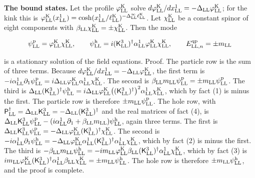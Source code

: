 \documentclass[
  10pt,
]{article}
\begin{document}
\textbf{The bound states.} Let the profile \(\varphi^{\rm K}_{\rm LL}\)
solve
\(d\varphi^{\rm K}_{\rm LL}/dx^1_{\rm LL}=-\Delta_{\rm LL}\varphi^{\rm K}_{\rm LL}\);
for the kink this is
\(\varphi^{\rm K}_{\rm LL}(x^1_{\rm LL})=\cosh(x^1_{\rm LL}/\ell^{\rm K}_{\rm LL})^{-\Delta^\infty_{\rm LL}\ell^{\rm K}_{\rm LL}}\).
Let \(\chi^{\rm K}_{\rm LL}\) be a constant spinor of eight components
with \(\beta_{\rm LL}\chi^{\rm K}_{\rm LL}=\pm\chi^{\rm K}_{\rm LL}\).
Then the mode

\[\psi^{\rm p}_{\rm LL}=\varphi^{\rm K}_{\rm LL}\chi^{\rm K}_{\rm LL},\qquad\psi^{\rm h}_{\rm LL}=i(\mathsf K^3_{\rm LL})^\dagger\alpha^1_{\rm LL}\varphi^{\rm K}_{\rm LL}\chi^{\rm K}_{\rm LL},\qquad E^{\rm qp}_{{\rm LL},n}=\pm m_{\rm LL}\]

is a stationary solution of the field equations. Proof. The particle row
is the sum of three terms. Because
\(d\varphi^{\rm K}_{\rm LL}/dx^1_{\rm LL}=-\Delta_{\rm LL}\varphi^{\rm K}_{\rm LL}\),
the first term is
\(-i\alpha^1_{\rm LL}\partial_1\psi^{\rm p}_{\rm LL}=i\Delta_{\rm LL}\varphi^{\rm K}_{\rm LL}\alpha^1_{\rm LL}\chi^{\rm K}_{\rm LL}\).
The second is
\(\beta_{\rm LL}m_{\rm LL}\psi^{\rm p}_{\rm LL}=\pm m_{\rm LL}\psi^{\rm p}_{\rm LL}\).
The third is
\(\Delta_{\rm LL}(\mathsf K^3_{\rm LL})^\dagger\psi^{\rm h}_{\rm LL}=i\Delta_{\rm LL}\varphi^{\rm K}_{\rm LL}\big((\mathsf K^3_{\rm LL})^\dagger\big)^2\alpha^1_{\rm LL}\chi^{\rm K}_{\rm LL}\),
which by fact (1) is minus the first. The particle row is therefore
\(\pm m_{\rm LL}\psi^{\rm p}_{\rm LL}\). The hole row, with
\(\mathsf P_{\rm LL}^\dagger=\Delta_{\rm LL}\mathsf K^3_{\rm LL}=-\Delta_{\rm LL}(\mathsf K^3_{\rm LL})^\dagger\)
and the real matrices of fact (4), is
\(\Delta_{\rm LL}\mathsf K^3_{\rm LL}\psi^{\rm p}_{\rm LL}-(i\alpha^1_{\rm LL}\partial_1+\beta_{\rm LL}m_{\rm LL})\psi^{\rm h}_{\rm LL}\),
again three terms. The first is
\(\Delta_{\rm LL}\mathsf K^3_{\rm LL}\psi^{\rm p}_{\rm LL}=-\Delta_{\rm LL}\varphi^{\rm K}_{\rm LL}(\mathsf K^3_{\rm LL})^\dagger\chi^{\rm K}_{\rm LL}\).
The second is
\(-i\alpha^1_{\rm LL}\partial_1\psi^{\rm h}_{\rm LL}=-\Delta_{\rm LL}\varphi^{\rm K}_{\rm LL}\alpha^1_{\rm LL}(\mathsf K^3_{\rm LL})^\dagger\alpha^1_{\rm LL}\chi^{\rm K}_{\rm LL}\),
which by fact (2) is minus the first. The third is
\(-\beta_{\rm LL}m_{\rm LL}\psi^{\rm h}_{\rm LL}=-im_{\rm LL}\varphi^{\rm K}_{\rm LL}\beta_{\rm LL}(\mathsf K^3_{\rm LL})^\dagger\alpha^1_{\rm LL}\chi^{\rm K}_{\rm LL}\),
which by fact (3) is
\(im_{\rm LL}\varphi^{\rm K}_{\rm LL}(\mathsf K^3_{\rm LL})^\dagger\alpha^1_{\rm LL}\beta_{\rm LL}\chi^{\rm K}_{\rm LL}=\pm m_{\rm LL}\psi^{\rm h}_{\rm LL}\).
The hole row is therefore \(\pm m_{\rm LL}\psi^{\rm h}_{\rm LL}\), and
the proof is complete.
\end{document}
